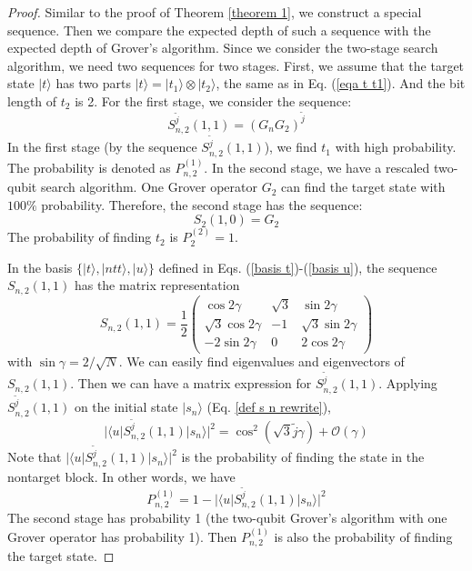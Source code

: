 \documentclass[%
 twocolumn,
 10pt,
 superscriptaddress,
 longbibliography,
 amsmath,amssymb,
 aps,
 pra,
floatfix,
]{revtex4-1}
\begin{document}
\begin{proof}
	Similar to the proof of Theorem \ref{theorem 1}, we construct a special sequence. Then we compare the expected depth of such a sequence with the expected depth of Grover's algorithm. Since we consider the two-stage search algorithm, we need two sequences for two stages. First, we assume that the target state $|t\rangle$ has two parts $|t\rangle=|t_1\rangle\otimes|t_2\rangle$, the same as in Eq. (\ref{eqa t t1}). And the bit length of $t_2$ is 2. For the first stage, we consider the sequence:
	\begin{equation}
		S^{\tilde j}_{n,2}(1,1) = \left(G_nG_2\right)^{\tilde j}
	\end{equation}
	In the first stage (by the sequence $S^{\tilde j}_{n,2}(1,1)$), we find $t_1$ with high probability. The probability is denoted as $P^{(1)}_{n,2}$. In the second stage, we have a rescaled two-qubit search algorithm. One Grover operator $G_2$ can find the target state with $100\%$ probability. Therefore, the second stage has the sequence:
	\begin{equation}
		S_{2}(1,0) = G_2
	\end{equation}
	The probability of finding $t_2$ is $P^{(2)}_{2}=1$.

	In the basis $\{|t\rangle,|ntt\rangle,|u\rangle\}$ defined in Eqs. (\ref{basis t})-(\ref{basis u}), the sequence $S_{n,2}(1,1)$ has the matrix representation
	\begin{equation}
		S_{n,2}(1,1) = \frac 1 2\left(
		\begin{array}{ccc}
				\cos 2\gamma        & \sqrt 3 & \sin 2\gamma         \\
				\sqrt 3\cos 2\gamma & -1      & \sqrt 3 \sin 2\gamma \\
				-2\sin 2\gamma      & 0       & 2\cos 2\gamma
			\end{array}
		\right)
	\end{equation}
	with $\sin \gamma = 2/\sqrt N$. We can easily find eigenvalues and eigenvectors of $S_{n,2}(1,1)$. Then we can have a matrix expression for $S^{\tilde j}_{n,2}(1,1)$. Applying $S^{\tilde j}_{n,2}(1,1)$ on the initial state $|s_n\rangle$ (Eq. \ref{def s n rewrite}), \begin{equation}
		|\langle u|S^{\tilde j}_{n,2}(1,1)|s_n\rangle|^2 = \cos^2(\sqrt 3 \tilde j\gamma)+\mathcal O(\gamma)
	\end{equation}
	Note that $|\langle u|S^{\tilde j}_{n,2}(1,1)|s_n\rangle|^2$ is the probability of finding the state in the nontarget block. In other words, we have
	\begin{equation}
		P^{(1)}_{n,2} = 1-|\langle u|S^{\tilde j}_{n,2}(1,1)|s_n\rangle|^2
	\end{equation}
	The second stage has probability 1 (the two-qubit Grover's algorithm with one Grover operator has probability 1). Then $P^{(1)}_{n,2}$ is also the probability of finding the target state.


\end{proof}
\end{document}
